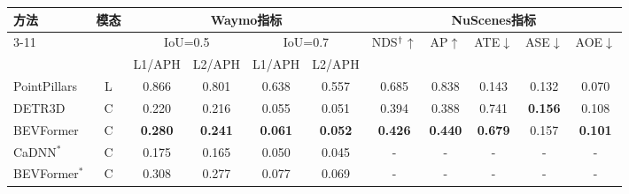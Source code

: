 \begin{tabular}{l| c| c c| c c|c c c c c }
\toprule
\multirow{3}{*}{方法} &\multirow{3}{*}{模态}  & \multicolumn{4}{c|}{Waymo指标} & \multicolumn{5}{c}{NuScenes指标} \\
\cline{3-11}
&  &\multicolumn{2}{c|}{IoU=0.5} & \multicolumn{2}{c|}{IoU=0.7} & 
\multirow{2}{*}{NDS$^{\text{\textdagger}}$$\uparrow$} &
\multirow{2}{*}{AP$\uparrow$} & \multirow{2}{*}{ATE$\downarrow$} & 
\multirow{2}{*}{ASE$\downarrow$} & \multirow{2}{*}{AOE$\downarrow$}\\
&  & L1/APH & L2/APH  & L1/APH & L2/APH  \\
 \midrule
 PointPillars~\cite{lang2019pointpillars}& L & 0.866 & 0.801 & 0.638 & 0.557&0.685 & 0.838 & 0.143 & 0.132 & 0.070\\
 \midrule
 DETR3D~\cite{wang2022detr3d}&C & 0.220 & 0.216 & 0.055 & 0.051 & 0.394&0.388 & 0.741 & \textbf{0.156} & 0.108\\
 \rowcolor{gray9}
 BEVFormer&C & \textbf{0.280} & \textbf{0.241} & \textbf{0.061} & \textbf{0.052}& \textbf{0.426}
 & \textbf{0.440} & \textbf{0.679} & 0.157 & \textbf{0.101}\\
\midrule
CaDNN$^*$~\cite{reading2021categorical}&C & 0.175 & 0.165 & 0.050 & 0.045&-& - &- &- &-\\ 
\rowcolor{gray9}
BEVFormer$^*$&C & 0.308 & 0.277 & 0.077 & 0.069 &-&-&-&-&-\\
\bottomrule

\end{tabular}